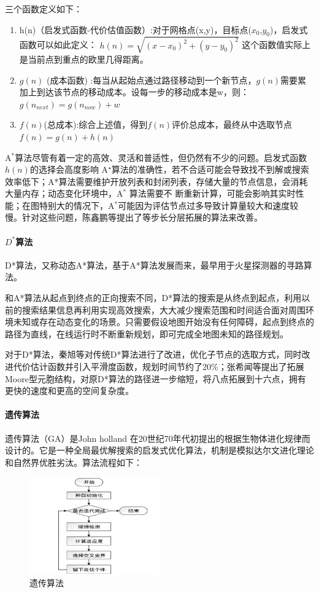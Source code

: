 \documentclass{report}
\begin{document}
三个函数定义如下：
\begin{enumerate}
\item 	h(n)（启发式函数-代价估值函数）:对于网格点(x,y)，目标点($x_0$,$y_0$)，启发式函数可以如此定义： \( h(n)=\sqrt{(x-x_0)^2+(y-y_0)^2} \) 这个函数值实际上是当前点到重点的欧里几得距离。
\item $g(n)$ (成本函数) :每当从起始点通过路径移动到一个新节点，$g(n)$需要累加上到达该节点的移动成本。设每一步的移动成本是w，则：$g(n_{next})=g(n_{now})+w$
  \item  $f(n)$(总成本):综合上述值，得到$f(n)$评价总成本，最终从中选取节点$f(n)=g(n)+h(n)$

  \end{enumerate}
  \newpage
A$^{*}$算法尽管有着一定的高效、灵活和普适性，但仍然有不少的问题。启发式函数$h(n)$的选择会高度影响 A$^\star$算法的准确性，若不合适可能会导致找不到解或搜索效率低下；A*算法需要维护开放列表和封闭列表，存储大量的节点信息，会消耗大量内存；动态变化环境中，A$^{*}$ 算法需要不 断重新计算，可能会影响其实时性能；在图特别大的情况下，A$^{*}$可能因为评估节点过多导致计算量较大和速度较慢。针对这些问题，陈鑫鹏等提出了等步长分层拓展的算法来改善\cite{jh3}。

\paragraph{$D^{*}$算法}

D*算法，又称动态A*算法，基于A*算法发展而来，最早用于火星探测器的寻路算法。

和A*算法从起点到终点的正向搜索不同，D*算法的搜索是从终点到起点，利用以前的搜索结果信息再利用实现高效搜索，大大减少搜索范围和时间适合面对周围环境未知或存在动态变化的场景。只需要假设地图开始没有任何障碍，起点到终点的路径为直线，在线运行时不断重新规划，即可完成全地图未知的路径规划。

对于D*算法，秦旭等对传统D*算法进行了改进，优化子节点的选取方式，同时改进代价估计函数并引入平滑度函数，规划时间节约了20\%；张希闻等提出了拓展Moore型元胞结构，对原D*算法的路径进一步缩短，将八点拓展到十六点，拥有更快的速度和更高的空间复杂度\cite{jh4}。
\paragraph{遗传算法}

遗传算法（GA）是John holland 在20世纪70年代初提出的根据生物体进化规律而设计的\cite{jh5}。它是一种全局最优解搜索的启发式优化算法，机制是模拟达尔文进化理论和自然界优胜劣汰。算法流程如下：
\begin{figure}[ht]
  \centering
  \includegraphics[width=0.5\textwidth]{figures/yichuan.png}
  \caption{遗传算法}
\end{figure}
\newpage
\end{document}
